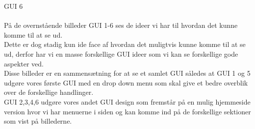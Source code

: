 \documentclass[a4paper]{article}
\begin{document}
GUI 6\\\\
På de overnstående billeder GUI 1-6 ses de ideer vi har til hvordan det kunne komme til at se ud.\\
Dette er dog stadig kun ide face af hvordan det muligtvis kunne komme til at se ud, derfor har vi en masse forskellige GUI ideer som vi kan se forskellige gode aspekter ved.\\
Disse billeder er en sammensætning for at se et samlet GUI således at GUI 1 og 5 udgøre vores første GUI med en drop down menu som skal give et bedre overblik over de forskellige handlinger.\\
GUI 2,3,4,6 udgøre vores andet GUI design som fremstår på en mulig hjemmeside version hvor vi har menuerne i siden og kan komme ind på de forskellige sektioner som vist på billederne.
\pagebreak
\end{document}
